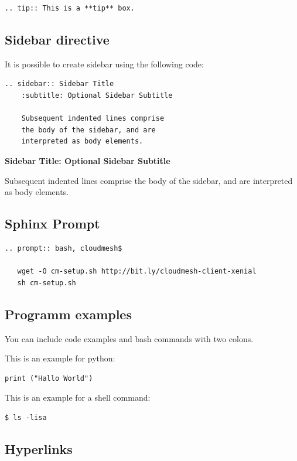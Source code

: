 \begin{verbatim}
.. tip:: This is a **tip** box.
\end{verbatim}

\subsection{Sidebar directive}\label{sidebar-directive}

It is possible to create sidebar using the following code:

\begin{verbatim}
.. sidebar:: Sidebar Title
    :subtitle: Optional Sidebar Subtitle

    Subsequent indented lines comprise
    the body of the sidebar, and are
    interpreted as body elements.
\end{verbatim}

\textbf{Sidebar Title: Optional Sidebar Subtitle}

Subsequent indented lines comprise the body of the sidebar, and are
interpreted as body elements.

\subsection{Sphinx Prompt}\label{sphinx-prompt}

\begin{verbatim}
.. prompt:: bash, cloudmesh$

   wget -O cm-setup.sh http://bit.ly/cloudmesh-client-xenial
   sh cm-setup.sh
\end{verbatim}

\subsection{Programm examples}\label{programm-examples}

You can include code examples and bash commands with two colons.

This is an example for python:

\begin{verbatim}
print ("Hallo World")
\end{verbatim}

This is an example for a shell command:

\begin{verbatim}
$ ls -lisa
\end{verbatim}

\subsection{Hyperlinks}\label{hyperlinks}

